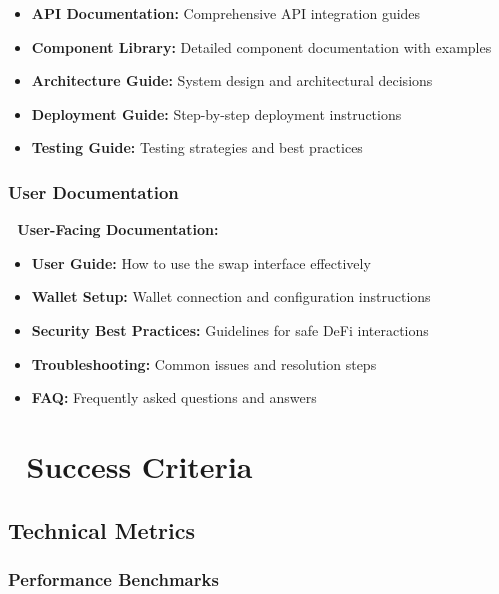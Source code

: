 \documentclass[12pt,a4paper]{article}
\begin{document}
\begin{itemize}
    \item \textbf{API Documentation:} Comprehensive API integration guides
    \item \textbf{Component Library:} Detailed component documentation with examples
    \item \textbf{Architecture Guide:} System design and architectural decisions
    \item \textbf{Deployment Guide:} Step-by-step deployment instructions
    \item \textbf{Testing Guide:} Testing strategies and best practices
\end{itemize}

\subsubsection{User Documentation}

\begin{tcolorbox}[colback=successGreen!10,colframe=successGreen]
\textbf{📖 User-Facing Documentation:}
\begin{itemize}
    \item \textbf{User Guide:} How to use the swap interface effectively
    \item \textbf{Wallet Setup:} Wallet connection and configuration instructions
    \item \textbf{Security Best Practices:} Guidelines for safe DeFi interactions
    \item \textbf{Troubleshooting:} Common issues and resolution steps
    \item \textbf{FAQ:} Frequently asked questions and answers
\end{itemize}
\end{tcolorbox}

\section{🎯 Success Criteria}

\subsection{Technical Metrics}

\subsubsection{Performance Benchmarks}
\end{document}
